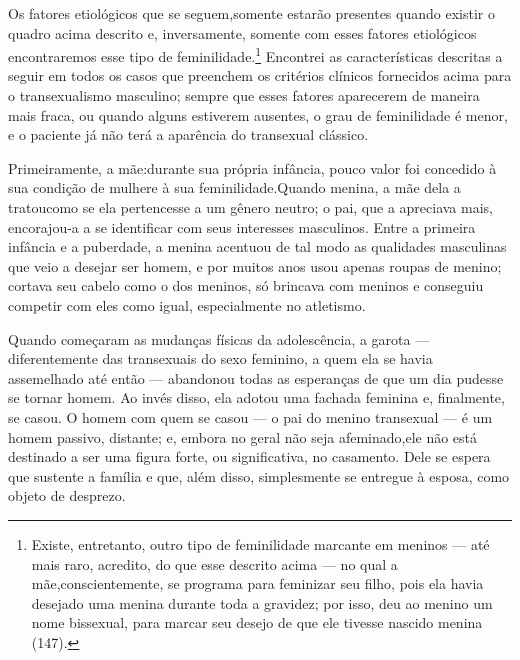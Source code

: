 Os fatores etiológicos que se seguem,\idxtranseetio[|(] somente estarão presentes
quando existir o quadro acima descrito e, inversamente, somente com
esses fatores etiológicos encontraremos esse tipo de feminilidade.\footnote{ Existe,
entretanto, outro tipo de feminilidade marcante em
meninos --- até mais raro, acredito, do que esse descrito acima ---
no qual a mãe,\idxmaesdese[|nn] conscientemente, se programa para feminizar seu filho,
pois ela havia desejado uma menina durante toda a gravidez; por isso,
deu ao menino um nome bissexual, para marcar seu desejo de que ele
tivesse nascido menina (147).} Encontrei as características descritas
a seguir em todos os casos que preenchem os critérios clínicos
fornecidos acima para o transexualismo masculino; sempre que esses
fatores aparecerem de maneira mais fraca, ou quando alguns estiverem
ausentes, o grau de feminilidade é menor, e o paciente já não terá a
aparência do transexual clássico.

Primeiramente,\idxmaesbiss{} a mãe:\idxpaisfilh[|(] durante sua própria infância,\idxfeminmaes{} pouco valor foi
concedido à sua condição de mulher\idxtransesimb[|(] e à sua feminilidade.\idxmaestran[|(] Quando menina,
a mãe dela a tratou\idxmaesfilh[|(] como se ela pertencesse a um gênero neutro; o pai,
que a apreciava mais, encorajou-a a se identificar com seus interesses
masculinos. Entre a primeira infância e a puberdade, a menina acentuou
de tal modo as qualidades masculinas que veio a desejar ser homem, e
por muitos anos usou apenas roupas de menino; cortava seu cabelo como o
dos meninos, só brincava com meninos e conseguiu competir com eles como
igual, especialmente no atletismo.

Quando começaram as mudanças físicas da adolescência, a garota ---
diferentemente das transexuais do sexo feminino, a quem ela se havia
assemelhado até então --- abandonou todas as esperanças de que um dia
pudesse se tornar homem. Ao invés disso, ela adotou uma fachada
feminina e, finalmente, se casou. O homem com quem se casou --- o pai
do menino transexual --- é um homem passivo, distante; e, embora no
geral não seja afeminado,\idxhomosafem[|)] ele não está destinado a ser uma figura
forte, ou significativa, no casamento. Dele se espera que sustente a
família e que, além disso, simplesmente se entregue à esposa, como
objeto de desprezo.

